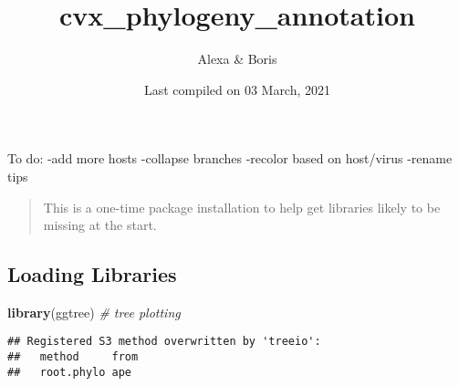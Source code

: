 \documentclass[
]{article}
\title{cvx\_phylogeny\_annotation}
\author{Alexa \& Boris}
\date{Last compiled on 03 March, 2021}
\newenvironment{Shaded}{\begin{snugshade}}{\end{snugshade}}
\newcommand{\CommentTok}[1]{\textcolor[rgb]{0.56,0.35,0.01}{\textit{#1}}}
\newcommand{\DataTypeTok}[1]{\textcolor[rgb]{0.13,0.29,0.53}{#1}}
\newcommand{\KeywordTok}[1]{\textcolor[rgb]{0.13,0.29,0.53}{\textbf{#1}}}
\newcommand{\NormalTok}[1]{#1}
\newcommand{\OperatorTok}[1]{\textcolor[rgb]{0.81,0.36,0.00}{\textbf{#1}}}
\newcommand{\OtherTok}[1]{\textcolor[rgb]{0.56,0.35,0.01}{#1}}
\newcommand{\StringTok}[1]{\textcolor[rgb]{0.31,0.60,0.02}{#1}}
\begin{document}
\maketitle

To do: -add more hosts -collapse branches -recolor based on host/virus
-rename tips

\begin{quote}
This is a one-time package installation to help get libraries likely to
be missing at the start.
\end{quote}

\begin{Shaded}
\end{Shaded}

\hypertarget{loading-libraries}{%
\subsection{Loading Libraries}\label{loading-libraries}}

\begin{Shaded}
\begin{Highlighting}[]
\KeywordTok{library}\NormalTok{(ggtree) }\CommentTok{# tree plotting}
\end{Highlighting}
\end{Shaded}

\begin{verbatim}
## Registered S3 method overwritten by 'treeio':
##   method     from
##   root.phylo ape
\end{verbatim}
\end{document}
